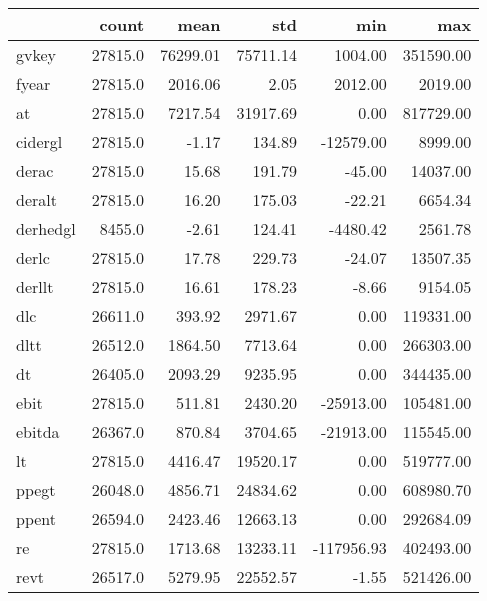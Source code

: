 \begin{tabular}{lrrrrr}
\toprule
{} &    count &      mean &       std &        min &         max \\
\midrule
gvkey                   &  27815.0 &  76299.01 &  75711.14 &    1004.00 &   351590.00 \\
fyear                   &  27815.0 &   2016.06 &      2.05 &    2012.00 &     2019.00 \\
at                      &  27815.0 &   7217.54 &  31917.69 &       0.00 &   817729.00 \\
cidergl                 &  27815.0 &     -1.17 &    134.89 &  -12579.00 &     8999.00 \\
derac                   &  27815.0 &     15.68 &    191.79 &     -45.00 &    14037.00 \\
deralt                  &  27815.0 &     16.20 &    175.03 &     -22.21 &     6654.34 \\
derhedgl                &   8455.0 &     -2.61 &    124.41 &   -4480.42 &     2561.78 \\
derlc                   &  27815.0 &     17.78 &    229.73 &     -24.07 &    13507.35 \\
derllt                  &  27815.0 &     16.61 &    178.23 &      -8.66 &     9154.05 \\
dlc                     &  26611.0 &    393.92 &   2971.67 &       0.00 &   119331.00 \\
dltt                    &  26512.0 &   1864.50 &   7713.64 &       0.00 &   266303.00 \\
dt                      &  26405.0 &   2093.29 &   9235.95 &       0.00 &   344435.00 \\
ebit                    &  27815.0 &    511.81 &   2430.20 &  -25913.00 &   105481.00 \\
ebitda                  &  26367.0 &    870.84 &   3704.65 &  -21913.00 &   115545.00 \\
lt                      &  27815.0 &   4416.47 &  19520.17 &       0.00 &   519777.00 \\
ppegt                   &  26048.0 &   4856.71 &  24834.62 &       0.00 &   608980.70 \\
ppent                   &  26594.0 &   2423.46 &  12663.13 &       0.00 &   292684.09 \\
re                      &  27815.0 &   1713.68 &  13233.11 & -117956.93 &   402493.00 \\
revt                    &  26517.0 &   5279.95 &  22552.57 &      -1.55 &   521426.00 \\

\end{tabular}
